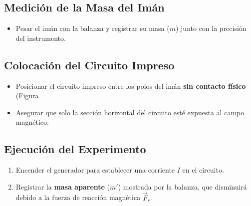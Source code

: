 \documentclass{article}
\begin{document}
\subsection{Medición de la Masa del Imán}
\begin{itemize}
    \item Pesar el imán con la balanza y registrar su masa (\( m \)) junto con la precisión del instrumento.
\end{itemize}

\subsection{Colocación del Circuito Impreso}
\begin{itemize}
    \item Posicionar el circuito impreso entre los polos del imán \textbf{sin contacto físico} (Figura 
    \item Asegurar que solo la sección horizontal del circuito esté expuesta al campo magnético.
\end{itemize}

\subsection{Ejecución del Experimento}
\begin{enumerate}
    \item Encender el generador para establecer una corriente \( I \) en el circuito.
    \item Registrar la \textbf{masa aparente} (\( m' \)) mostrada por la balanza, que disminuirá debido a la fuerza de reacción magnética \( \vec{F}_r \).
\end{enumerate}
\end{document}
